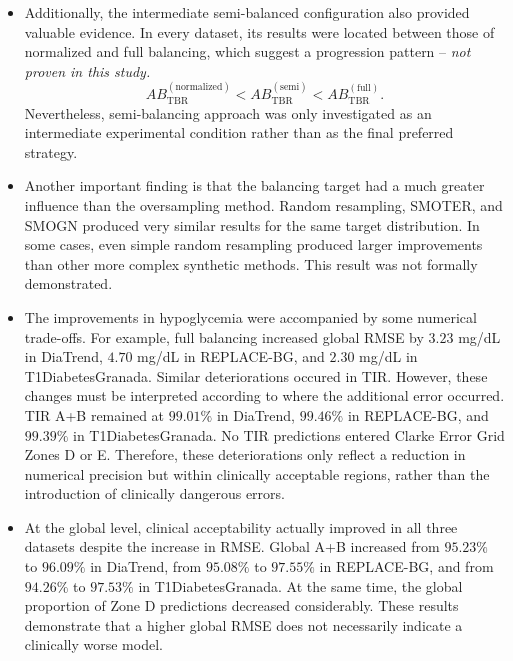 \begin{itemize}
    \item Additionally, the intermediate semi-balanced configuration also provided valuable evidence. In every dataset, its results were located between those of normalized and full balancing, which suggest a progression pattern -- \textit{not proven in this study.}
        \begin{equation}
        AB_{\mathrm{TBR}}^{(\mathrm{normalized})}
        <
        AB_{\mathrm{TBR}}^{(\mathrm{semi})}
        <
        AB_{\mathrm{TBR}}^{(\mathrm{full})}.
        \end{equation}
    Nevertheless, semi-balancing approach was only investigated as an intermediate experimental condition rather than as the final preferred strategy.
    \item Another important finding is that the balancing target had a much greater influence than the oversampling method. Random resampling, SMOTER, and SMOGN produced very similar results for the same target distribution. In some cases, even simple random resampling produced larger improvements than other more complex synthetic methods. This result was not formally demonstrated.
    \item The improvements in hypoglycemia were accompanied by some numerical trade-offs. For example, full balancing increased global RMSE by \(3.23\) mg/dL in DiaTrend, \(4.70\) mg/dL in REPLACE-BG, and \(2.30\) mg/dL in T1DiabetesGranada. Similar deteriorations occured in TIR. However, these changes must be interpreted according to where the additional error occurred. TIR A+B remained at \(99.01\%\) in DiaTrend, \(99.46\%\) in REPLACE-BG, and \(99.39\%\) in T1DiabetesGranada. No TIR predictions entered Clarke Error Grid Zones D or E. Therefore, these deteriorations only reflect a reduction in numerical precision but within clinically acceptable regions, rather than the introduction of clinically dangerous errors.
    \item At the global level, clinical acceptability actually improved in all three datasets despite the increase in RMSE. Global A+B increased from \(95.23\%\) to \(96.09\%\) in DiaTrend, from \(95.08\%\) to \(97.55\%\) in REPLACE-BG, and from \(94.26\%\) to \(97.53\%\) in T1DiabetesGranada. At the same time, the global proportion of Zone D predictions decreased considerably. These results demonstrate that a higher global RMSE does not necessarily indicate a clinically worse model.

\end{itemize}
